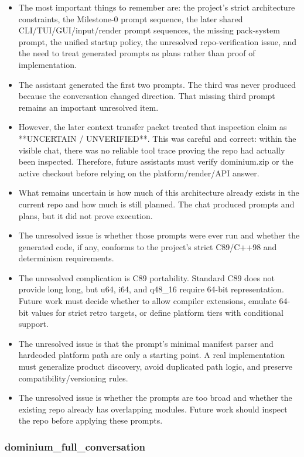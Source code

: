 \documentclass[11pt,a4paper]{report}
\begin{document}
\begin{itemize}
\item The most important things to remember are: the project's strict architecture constraints, the Milestone-0 prompt sequence, the later shared CLI/TUI/GUI/input/render prompt sequences, the missing pack-system prompt, the unified startup policy, the unresolved repo-verification issue, and the need to treat generated prompts as plans rather than proof of implementation.
\item The assistant generated the first two prompts. The third was never produced because the conversation changed direction. That missing third prompt remains an important unresolved item.
\item However, the later context transfer packet treated that inspection claim as **UNCERTAIN / UNVERIFIED**. This was careful and correct: within the visible chat, there was no reliable tool trace proving the repo had actually been inspected. Therefore, future assistants must verify dominium.zip or the active checkout before relying on the platform/render/API answer.
\item What remains uncertain is how much of this architecture already exists in the current repo and how much is still planned. The chat produced prompts and plans, but it did not prove execution.
\item The unresolved issue is whether those prompts were ever run and whether the generated code, if any, conforms to the project's strict C89/C++98 and determinism requirements.
\item The unresolved complication is C89 portability. Standard C89 does not provide long long, but u64, i64, and q48\_16 require 64-bit representation. Future work must decide whether to allow compiler extensions, emulate 64-bit values for strict retro targets, or define platform tiers with conditional support.
\item The unresolved issue is that the prompt's minimal manifest parser and hardcoded platform path are only a starting point. A real implementation must generalize product discovery, avoid duplicated path logic, and preserve compatibility/versioning rules.
\item The unresolved issue is whether the prompts are too broad and whether the existing repo already has overlapping modules. Future work should inspect the repo before applying these prompts.
\end{itemize}

\subsubsection{dominium\_full\_conversation}
\end{document}
